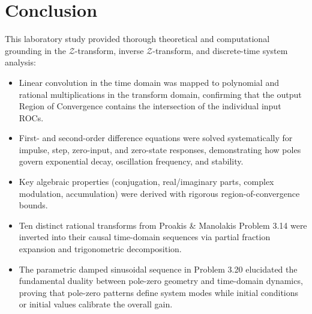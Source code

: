 \documentclass[12pt,a4paper]{article}
\begin{document}
\section{Conclusion}
This laboratory study provided thorough theoretical and computational grounding in the $\mathcal{Z}$-transform, inverse $\mathcal{Z}$-transform, and discrete-time system analysis:
\begin{itemize}
    \item Linear convolution in the time domain was mapped to polynomial and rational multiplications in the transform domain, confirming that the output Region of Convergence contains the intersection of the individual input ROCs.
    \item First- and second-order difference equations were solved systematically for impulse, step, zero-input, and zero-state responses, demonstrating how poles govern exponential decay, oscillation frequency, and stability.
    \item Key algebraic properties (conjugation, real/imaginary parts, complex modulation, accumulation) were derived with rigorous region-of-convergence bounds.
    \item Ten distinct rational transforms from Proakis \& Manolakis Problem 3.14 were inverted into their causal time-domain sequences via partial fraction expansion and trigonometric decomposition.
    \item The parametric damped sinusoidal sequence in Problem 3.20 elucidated the fundamental duality between pole-zero geometry and time-domain dynamics, proving that pole-zero patterns define system modes while initial conditions or initial values calibrate the overall gain.
\end{itemize}
\end{document}
